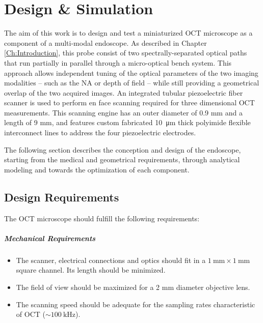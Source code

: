 %

\chapter{Design \& Simulation}
\label{Ch:DesignSimulation}	

The aim of this work is to design and test a miniaturized OCT microscope as a component of a multi-modal endoscope. As described in Chapter \ref{Ch:Introduction}, this probe consist of two spectrally-separated optical paths that run partially in parallel through a micro-optical bench system. This approach allows independent tuning of the optical parameters of the two imaging modalities -- such as the NA or depth of field -- while still providing a geometrical overlap of the two acquired images. An integrated tubular piezoelectric fiber scanner is used to perform en face scanning required for three dimensional OCT measurements. This scanning engine has an outer diameter of 0.9 mm and a length of 9 mm, and features custom fabricated \SI{10}{\micro\meter} thick polyimide flexible interconnect lines to address the four piezoelectric electrodes.

The following section describes the conception and design of the endoscope, starting from the medical and geometrical requirements, through analytical modeling and towards the optimization of each component.

\section{Design Requirements}



The OCT microscope should fulfill the following requirements:

\paragraph{Mechanical Requirements} 
\begin{itemize}

\item The scanner, electrical connections and optics should fit in a $\SI{1}{\milli\meter} \times \SI{1}{\milli\meter}$ square channel. Its length should be minimized.
\item The field of view should be maximized for a 2 mm diameter objective lens.
\item The scanning speed should be adequate for the sampling rates characteristic of OCT ($\sim \SI{100}{\kilo\hertz} $).
\end{itemize}


